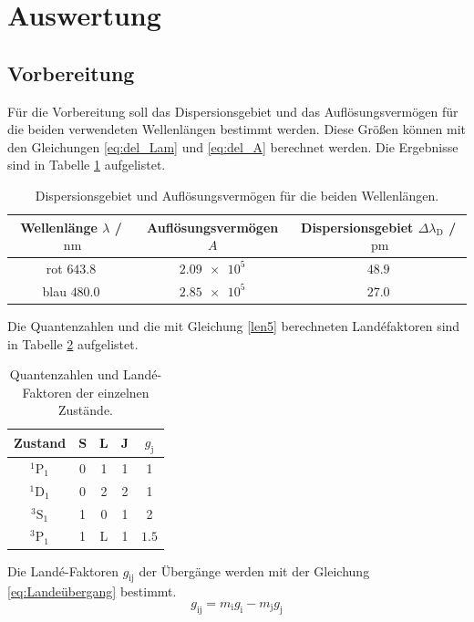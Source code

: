 \section{Auswertung}
\label{sec:Auswertung}
\subsection{Vorbereitung}
Für die Vorbereitung soll das Dispersionsgebiet und das Auflösungsvermögen für die beiden 
verwendeten Wellenlängen bestimmt werden. Diese Größen können mit den Gleichungen \eqref{eq:del_Lam} und \eqref{eq:del_A} berechnet werden.
Die Ergebnisse sind in Tabelle \ref{tab:Vorbereitung} aufgelistet.
\FloatBarrier
\begin{table}
    \centering
    \caption{Dispersionsgebiet und Auflösungsvermögen für die beiden Wellenlängen.}
    \label{tab:Vorbereitung}
    \begin{tabular}{c c c}
        \toprule
        Wellenlänge $\lambda$ / $\SI{}{\nano\meter}$&Auflösungsvermögen $A$& Dispersionsgebiet $\Delta \lambda_{\text{D}}$ / $\SI{}{\pico\meter}$\\
        \midrule
        rot $\num{643.8}$&$\num{2.09e5}$&$\num{48.9}$\\
        blau $\num{480.0}$&$\num{2.85e5}$&$\num{27.0}$\\
        \bottomrule
    \end{tabular}
\end{table}
\FloatBarrier
Die Quantenzahlen und die mit Gleichung \eqref{len5} berechneten Landéfaktoren sind in Tabelle \ref{tab:Quantenzahlen} 
aufgelistet.
\FloatBarrier
\begin{table}
    \centering
    \caption{Quantenzahlen und Landé-Faktoren der einzelnen Zustände.}
    \label{tab:Quantenzahlen}
    \begin{tabular}{c c c c c}
        \toprule
        Zustand&S&L&J&$g_{\text{j}}$\\
        \midrule
        $^1\text{P}_1$&0&1&1&1\\
        $^1\text{D}_1$&0&2&2&1\\
        $^3\text{S}_1$&1&0&1&2\\
        $^3\text{P}_1$&1&L&1&$\num{1.5}$\\
        \bottomrule
    \end{tabular}
\end{table}
\FloatBarrier
Die Landé-Faktoren $g_{\text{ij}}$ der Übergänge werden mit der Gleichung \eqref{eq:Landeübergang} bestimmt.
\begin{equation}
    \label{eq:Landeübergang}
    g_{\text{ij}} = m_{\text{i}}g_{\text{i}} - m_{\text{j}}g_{\text{j}}
\end{equation}
